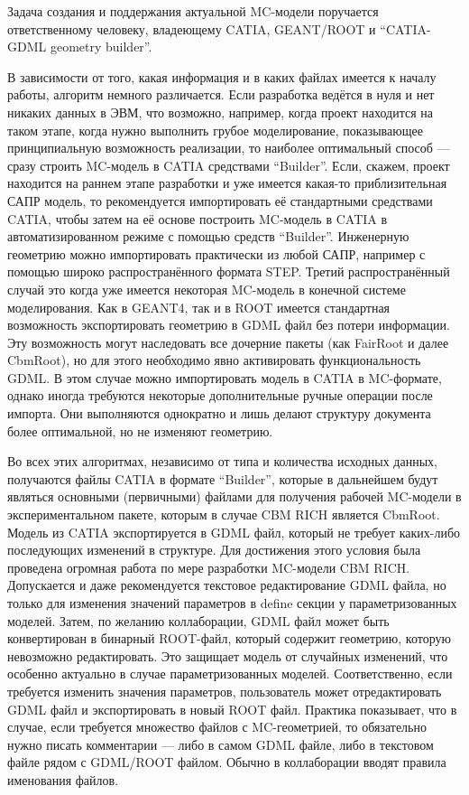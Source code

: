 Задача создания и поддержания актуальной MC-модели поручается ответственному человеку, владеющему CATIA, GEANT/ROOT и ``CATIA-GDML geometry builder''.

В зависимости от того, какая информация и в каких файлах имеется к началу работы, алгоритм немного различается.
Если разработка ведётся в нуля и нет никаких данных в ЭВМ, что возможно, например, когда проект находится на таком этапе, когда нужно выполнить грубое моделирование, показывающее принципиальную возможность реализации, то наиболее оптимальный способ --- сразу строить MC-модель в CATIA средствами ``Builder''.
Если, скажем, проект находится на раннем этапе разработки и уже имеется какая-то приблизительная САПР модель, то рекомендуется импортировать её стандартными средствами CATIA, чтобы затем на её основе построить MC-модель в CATIA в автоматизированном режиме с помощью средств ``Builder''. Инженерную геометрию можно импортировать практически из любой САПР, например с помощью широко распространённого формата STEP. 
Третий распространённый случай это когда уже имеется некоторая MC-модель в конечной системе моделирования. Как в GEANT4, так и в ROOT имеется стандартная возможность экспортировать геометрию в GDML файл без потери информации. Эту возможность могут наследовать все дочерние пакеты (как FairRoot и далее CbmRoot), но для этого необходимо явно активировать функциональность GDML. В этом случае можно импортировать модель в CATIA в MC-формате, однако иногда требуются некоторые дополнительные ручные операции после импорта. Они выполняются однократно и лишь делают структуру документа более оптимальной, но не изменяют геометрию.

Во всех этих алгоритмах, независимо от типа и количества исходных данных, получаются файлы CATIA в формате ``Builder'', которые в дальнейшем будут являться основными (первичными) файлами для получения рабочей MC-модели в экспериментальном пакете, которым в случае CBM RICH является CbmRoot. Модель из CATIA экспортируется в GDML файл, который не требует каких-либо последующих изменений в структуре. Для достижения этого условия была проведена огромная работа по мере разработки MC-модели CBM RICH. Допускается и даже рекомендуется текстовое редактирование GDML файла, но только для изменения значений параметров в define секции у параметризованных моделей. Затем, по желанию коллаборации, GDML файл может быть конвертирован в бинарный ROOT-файл, который содержит геометрию, которую невозможно редактировать. Это защищает модель от случайных изменений, что особенно актуально в случае параметризованных моделей. Соответственно, если требуется изменить значения параметров, пользователь может отредактировать GDML файл и экспортировать в новый ROOT файл. Практика показывает, что в случае, если требуется множество файлов с MC-геометрией, то обязательно нужно писать комментарии --- либо в самом GDML файле, либо в текстовом файле рядом с GDML/ROOT файлом. Обычно в коллаборации вводят правила именования файлов.

